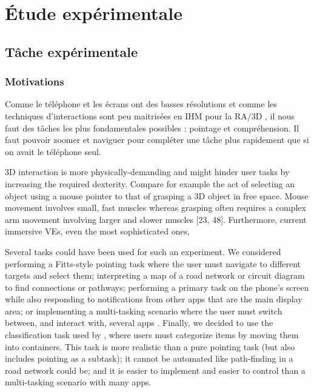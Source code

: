 \chapter{Étude expérimentale}
\label{ch:experiment}

\section{Tâche expérimentale}
\label{sec:experiment_task}

\subsection{Motivations}
Comme le téléphone et les écrans ont des basses résolutions et comme les techniques d'interactions sont peu maitrisées en IHM pour la RA/3D \citep{Piumsomboon2013}, il nous faut des tâches les plus fondamentales possibles : pointage et compréhension. Il faut pouvoir zoomer et naviguer pour compléter une tâche plus rapidement que si on avait le téléphone seul.

3D interaction is more physically-demanding and might hinder user tasks by increasing the required dexterity. Compare for example the act of selecting an object using a mouse pointer to that of grasping a 3D object in free space. Mouse movement involves small, fast muscles whereas grasping often requires a complex arm movement involving larger and slower muscles [23, 48]. Furthermore, current immersive VEs, even the most sophisticated ones, \cite{Argelaguet2013}

Several tasks could have been used for such an experiment. We considered performing a Fitts-style pointing task \citep{Soukoreff2004} where the user must navigate to different targets and select them; interpreting a map of a road network \citep{Baudisch2002} or circuit diagram to find connections or pathways; performing a primary task on the phone's screen while also responding to notifications from other apps that are  the main display area; or implementing a multi-tasking scenario where the user must switch between, and interact with, several apps \citep{Ens2014}. Finally, we decided to use the classification task used by \cite{Liu2014}, where users must categorize items by moving them into containers. This task is more realistic than a pure pointing task (but also includes pointing as a subtask); it cannot be automated like path-finding in a road network could be; and it is easier to implement and easier to control than a multi-tasking scenario with many apps.

